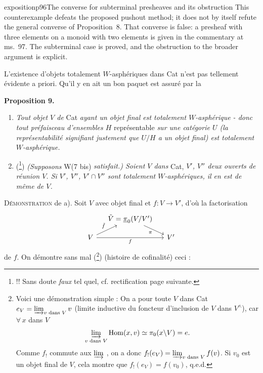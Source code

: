 \begin{dcomment}{exposition}{p96}{The converse for subterminal presheaves and its obstruction}
This counterexample defeats the proposed pushout method; it does not by itself refute the general converse of Proposition~8. That converse is false: a presheaf with three elements on a monoid with two elements is given in the commentary at ms.~97. The subterminal case is proved, and the obstruction to the broader argument is explicit.
\end{dcomment}


L'existence d'objets totalement $W$-asphériques dans Cat n'est pas tellement évidente a priori. Qu'il y en ait un bon paquet est assuré par la

\setcounter{footnote}{65}


\noindent\textbf{Proposition 9.}

\begin{enumerate}[label=\textit{\alph*)}]
\item \textit{Tout objet $V$ de} Cat \textit{ayant un objet final est totalement $W$-asphérique - donc tout préfaisceau d'ensembles $H$} représentable \textit{sur une catégorie $U$ (la représentabilité signifiant justement que $U/H$ a un objet final) est totalement $W$-asphérique.}

\item (\footnote{!! Sans doute \textit{faux} tel quel, cf. rectification page suivante.}) \textit{(Supposons} W(7 bis) \textit{satisfait.) Soient $V$ dans} Cat, \textit{$V'$, $V''$ deux ouverts de réunion $V$. Si $V'$, $V''$, $V'\cap V''$ sont totalement $W$-asphériques, il en est de même de $V$.}
\end{enumerate}

\noindent\textsc{Démonstration} de a). Soit $V$ avec objet final et $f : V \longrightarrow V'$, d'où la factorisation
\[
\begin{tikzcd}[column sep=small, row sep=small]
 & \tilde{V} = \upi_0(V/V') \arrow[dr, "\pi"'] & \\
V \arrow[ur, "\tilde{f}"] \arrow[rr, "f"'] & & V'
\end{tikzcd}
\]
de $f$. On démontre sans mal (\footnote{Voici une démonstration simple : On a pour toute $V$ dans Cat $e_V = \varinjlim_{v \text{ dans } V} v$ (limite inductive du foncteur d'inclusion de $V$ dans $V^\wedge$), car $\forall\, x$ dans $V$
\[
\varinjlim_{v \text{ dans } V} \mathrm{Hom}(x,v) \simeq \pi_0(x\backslash V) = e.
\]
Comme $f_!$ commute aux $\varinjlim$ , on a donc $f_!(e_V) = \varinjlim_{v \text{ dans } V} f(v)$. Si $v_0$ est un objet final de $V$, cela montre que $f_!(e_V) = f(v_0)$, q.e.d.}) (histoire de cofinalité) ceci :


